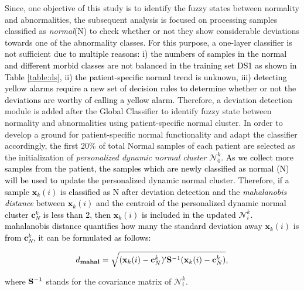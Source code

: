 Since, one objective of this study is to identify the fuzzy states between normality and abnormalities, the subsequent analysis is focused on processing samples classified as \textit{normal}(N) 
to check whether or not they show considerable deviations towards one of the abnormality classes. For this purpose, a one-layer classifier is not sufficient \textcolor{black}{due to multiple reasons: i) the numbers of samples in the normal and different morbid classes are not balanced in the training set DS1 as shown in Table \ref{table:ds}, ii) the patient-specific normal trend is unknown, iii) detecting yellow alarms require a new set of decision rules to determine whether or not the deviations are worthy of calling a yellow alarm.} Therefore, a deviation detection module is added after the Global Classifier to identify fuzzy state between normality and abnormalities %
using patient-specific normal cluster. In order to develop a ground for patient-specific normal functionality and adapt the classifier accordingly, the first 20\% of total Normal samples of each patient are selected as the initialization of \textit{personalized dynamic normal cluster} $\mathcal{N}_0^k$. \textcolor{black}{As we collect more samples from the patient, the samples which are newly classified as normal (N) will be used to update the personalized dynamic normal cluster. Therefore, if a sample $\mathbf{x}_k(i)$ is classified as N after deviation detection and the \textit{mahalanobis distance} between $\mathbf{x}_k(i)$ and the centroid of the personalized dynamic normal cluster $\mathbf{c}^k_N$ is less than 2, then $\mathbf{x}_k(i)$ is included in the updated $\mathcal{N}_i^k$. mahalanobis distance quantifies how many the standard deviation away $\mathbf{x}_k(i)$ is from $\mathbf{c}^k_N$, it can be formulated as follows:}

\begin{align}
d_{\mathbf{mahal}} = \sqrt{ (\mathbf{x}_k(i)- \mathbf{c}^k_N)' {\rm \bf S}^{-1} (\mathbf{x}_k(i) - \mathbf{c}^k_N) },
\end{align}

where ${\rm \bf S}^{-1}$ stands for the covariance matrix of $\mathcal{N}_i^k$.


